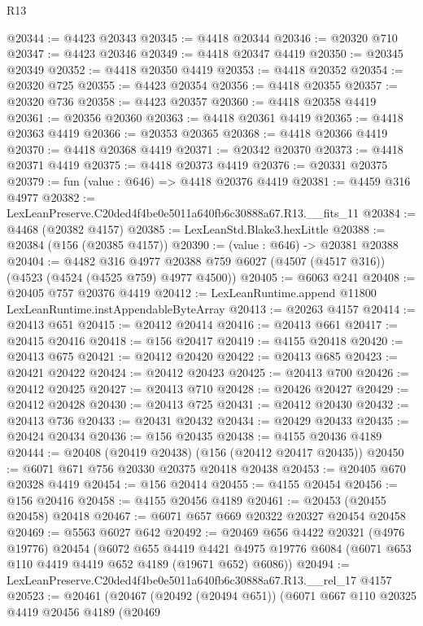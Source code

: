 \begin{lexlean}{R13}
\begin{coremodule}
@20344 := @4423 @20343
@20345 := @4418 @20344
@20346 := @20320 @710
@20347 := @4423 @20346
@20349 := @4418 @20347 @4419
@20350 := @20345 @20349
@20352 := @4418 @20350 @4419
@20353 := @4418 @20352
@20354 := @20320 @725
@20355 := @4423 @20354
@20356 := @4418 @20355
@20357 := @20320 @736
@20358 := @4423 @20357
@20360 := @4418 @20358 @4419
@20361 := @20356 @20360
@20363 := @4418 @20361 @4419
@20365 := @4418 @20363 @4419
@20366 := @20353 @20365
@20368 := @4418 @20366 @4419
@20370 := @4418 @20368 @4419
@20371 := @20342 @20370
@20373 := @4418 @20371 @4419
@20375 := @4418 @20373 @4419
@20376 := @20331 @20375
@20379 := fun (value : @646) => @4418 @20376 @4419
@20381 := @4459 @316 @4977
@20382 := LexLeanPreserve.C20ded4f4be0e5011a640fb6c30888a67.R13.__fits_11
@20384 := @4468 (@20382 @4157)
@20385 := LexLeanStd.Blake3.hexLittle
@20388 := @20384 (@156 (@20385 @4157))
@20390 := (value : @646) -> @20381 @20388
@20404 := @4482
    @316
    @4977
    @20388
    @759
    @6027
    (@4507 (@4517 @316))
    (@4523 (@4524 (@4525 @759) @4977 @4500))
@20405 := @6063 @241
@20408 := @20405 @757 @20376 @4419
@20412 := LexLeanRuntime.append @11800 LexLeanRuntime.instAppendableByteArray
@20413 := @20263 @4157
@20414 := @20413 @651
@20415 := @20412 @20414
@20416 := @20413 @661
@20417 := @20415 @20416
@20418 := @156 @20417
@20419 := @4155 @20418
@20420 := @20413 @675
@20421 := @20412 @20420
@20422 := @20413 @685
@20423 := @20421 @20422
@20424 := @20412 @20423
@20425 := @20413 @700
@20426 := @20412 @20425
@20427 := @20413 @710
@20428 := @20426 @20427
@20429 := @20412 @20428
@20430 := @20413 @725
@20431 := @20412 @20430
@20432 := @20413 @736
@20433 := @20431 @20432
@20434 := @20429 @20433
@20435 := @20424 @20434
@20436 := @156 @20435
@20438 := @4155 @20436 @4189
@20444 := @20408 (@20419 @20438) (@156 (@20412 @20417 @20435))
@20450 := @6071 @671 @756 @20330 @20375 @20418 @20438
@20453 := @20405 @670 @20328 @4419
@20454 := @156 @20414
@20455 := @4155 @20454
@20456 := @156 @20416
@20458 := @4155 @20456 @4189
@20461 := @20453 (@20455 @20458) @20418
@20467 := @6071 @657 @669 @20322 @20327 @20454 @20458
@20469 := @5563 @6027 @642
@20492 := @20469
    @656
    @4422
    @20321
    (@4976 @19776)
    @20454
    (@6072
      @655
      @4419
      @4421
      @4975
      @19776
      @6084
      (@6071 @653 @110 @4419 @4419 @652 @4189 (@19671 @652) @6086))
@20494 := LexLeanPreserve.C20ded4f4be0e5011a640fb6c30888a67.R13.__rel_17 @4157
@20523 := @20461
    (@20467
      (@20492 (@20494 @651))
      (@6071
        @667
        @110
        @20325
        @4419
        @20456
        @4189
        (@20469

\end{coremodule}
\end{lexlean}
